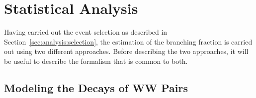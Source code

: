 \section{Statistical Analysis}
\label{sec:analysis:method}



Having carried out the event selection as described in Section~\ref{sec:analysis:selection}, the estimation of the \PW branching fraction is carried out using two different approaches.  Before describing the two approaches, it will be useful to describe the formalism that is common to both.



\subsection{Modeling the Decays of WW Pairs}
\label{sec:analysis:method:effMatrix}


